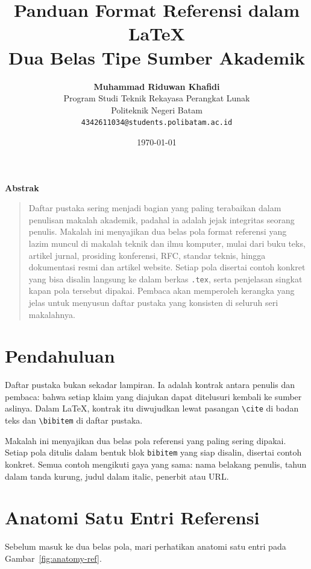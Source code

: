 \documentclass[11pt,a4paper]{article}
\title{\vspace{-1.5cm}\textbf{\sffamily\LARGE Panduan Format Referensi dalam LaTeX\\ Dua Belas Tipe Sumber Akademik}}
\author{
	\textbf{Muhammad Riduwan Khafidi} \\
	\small Program Studi Teknik Rekayasa Perangkat Lunak \\
	\small Politeknik Negeri Batam \\
	\small \texttt{4342611034@students.polibatam.ac.id}
}
\date{\small\today}
\renewenvironment{abstract}
{\small
	\begin{center}\textbf{\sffamily Abstrak}\end{center}
	\begin{quote}}
	{\end{quote}}
\begin{document}
\maketitle
\thispagestyle{empty}

\begin{abstract}
	Daftar pustaka sering menjadi bagian yang paling terabaikan dalam penulisan makalah akademik, padahal ia adalah jejak integritas seorang penulis. Makalah ini menyajikan dua belas pola format referensi yang lazim muncul di makalah teknik dan ilmu komputer, mulai dari buku teks, artikel jurnal, prosiding konferensi, RFC, standar teknis, hingga dokumentasi resmi dan artikel website. Setiap pola disertai contoh konkret yang bisa disalin langsung ke dalam berkas \texttt{.tex}, serta penjelasan singkat kapan pola tersebut dipakai. Pembaca akan memperoleh kerangka yang jelas untuk menyusun daftar pustaka yang konsisten di seluruh seri makalahnya.
\end{abstract}

\section{Pendahuluan}

Daftar pustaka bukan sekadar lampiran. Ia adalah kontrak antara penulis dan pembaca: bahwa setiap klaim yang diajukan dapat ditelusuri kembali ke sumber aslinya. Dalam LaTeX, kontrak itu diwujudkan lewat pasangan \texttt{\textbackslash cite} di badan teks dan \texttt{\textbackslash bibitem} di daftar pustaka.

Makalah ini menyajikan dua belas pola referensi yang paling sering dipakai. Setiap pola ditulis dalam bentuk blok \texttt{bibitem} yang siap disalin, disertai contoh konkret. Semua contoh mengikuti gaya yang sama: nama belakang penulis, tahun dalam tanda kurung, judul dalam italic, penerbit atau URL.

\section{Anatomi Satu Entri Referensi}

Sebelum masuk ke dua belas pola, mari perhatikan anatomi satu entri pada Gambar~\ref{fig:anatomy-ref}.
\end{document}
